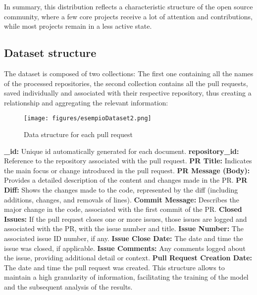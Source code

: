 In summary, this distribution reflects a characteristic structure of the open source community, where a few core projects receive a lot of attention and contributions, while most projects remain in a less active state.
\subsection{Dataset structure}
The dataset is composed of two collections:
The first one containing all the names of the processed repositories,
the second collection contains all the pull requests, saved individually and associated with their respective repository, thus creating a relationship and aggregating the relevant information:
\begin{figure}[H] 
    \centering
        \texttt{[image: figures/esempioDataset2.png]}
        \caption{Data structure for each pull request}
\end{figure}
\textbf{\_id:} Unique id automatically generated for each document.
\newline
\textbf{repository\_id:} Reference to the repository associated with the pull request.
\newline
\textbf{PR Title:} Indicates the main focus or change introduced in the pull request.
\newline
\textbf{PR Message (Body):} Provides a detailed description of the content and changes made in the PR.
\newline
\textbf{PR Diff:} Shows the changes made to the code, represented by the diff (including additions, changes, and removals of lines).
\newline
\textbf{Commit Message:} Describes the major change in the code, associated with the first commit of the PR.
\newline
\textbf{Closed Issues:} If the pull request closes one or more issues, those issues are logged and associated with the PR, with the issue number and title.
\newline
\textbf{Issue Number:} The associated issue ID number, if any.
\newline
\textbf{Issue Close Date:} The date and time the issue was closed, if applicable.
\newline
\textbf{Issue Comments:} Any comments logged about the issue, providing additional detail or context.
\newline
\textbf{Pull Request Creation Date:} The date and time the pull request was created.
\newline
This structure allows to maintain a high granularity of information, facilitating the training of the model and the subsequent analysis of the results.
